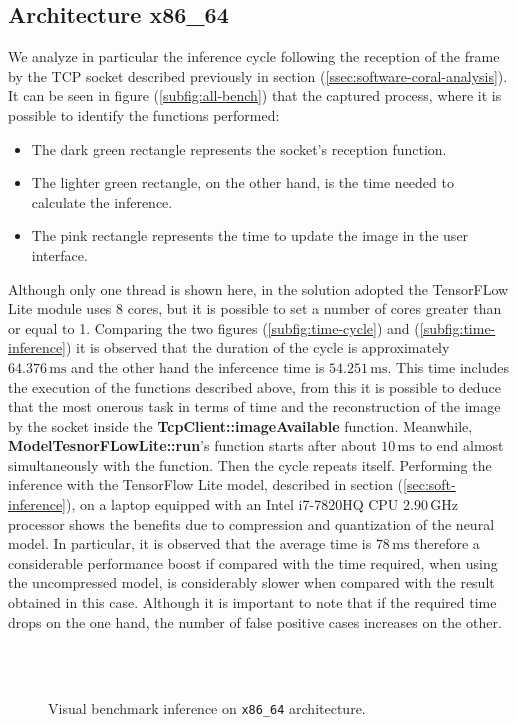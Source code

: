 \subsection{Architecture x86\_64}
\label{ssec:x86-bench-inference}
We analyze in particular the inference cycle following the reception of the
frame by the TCP socket described previously in section
(\ref{ssec:software-coral-analysis}). It can be seen in figure
(\ref{subfig:all-bench}) that the captured process, where it is possible to
identify the functions performed:
\begin{itemize}
	\item The dark green rectangle represents the socket's reception function.
	\item The lighter green rectangle, on the other hand, is the time needed to calculate the inference.
	\item The pink rectangle represents the time to update the image in the user interface.
\end{itemize}
Although only one thread is shown here, in the solution adopted the TensorFLow
Lite module uses 8 cores, but it is possible to set a number of cores greater
than or equal to 1.
Comparing the two figures (\ref{subfig:time-cycle}) and
(\ref{subfig:time-inference}) it is observed that the duration of the cycle is
approximately $64.376 \,\si{\milli\second}$ and the other hand the infercence time
is $54.251 \,\si{\milli\second}$.
This time includes the execution of the functions described above, from this it
is possible to deduce that the most onerous task in terms of time and the
reconstruction of the image by the socket inside the
\textbf{TcpClient::imageAvailable} function. 
Meanwhile, \textbf{ModelTesnorFLowLite::run}'s function starts after about $10
\,\si{\milli\second}$ to end almost simultaneously with the function. Then the
cycle repeats itself.
Performing the inference with the TensorFlow Lite model, described in section
(\ref{sec:soft-inference}), on a laptop equipped with an Intel i7-7820HQ CPU
$2.90 \,\si{\giga\hertz}$ processor shows the benefits due to compression and
quantization of the neural model.
In particular, it is observed that the average time is $78 \,\si{\milli\second}$
therefore a considerable performance boost if compared with the time required,
when using the uncompressed model, is considerably slower when compared with the
result obtained in this case.
Although it is important to note that if the required time drops on the one
hand, the number of false positive cases increases on the other. 
%
\begin{figure}[htb]
	\centering
	 \\
	 \\
	\caption{Visual benchmark inference on \texttt{x86\_64} architecture.}
	\label{fig:x86-bench}
\end{figure}
%
%
